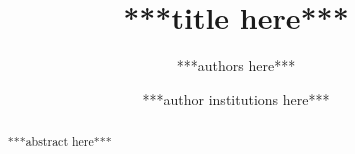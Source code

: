 \documentclass{wssci}
\title{***title here***}
\author{***authors here***} %
\date{***author institutions here***}
\begin{document}
\maketitle


\begin{abstract}
    ***abstract here***
\end{abstract}


% 
\end{document}
